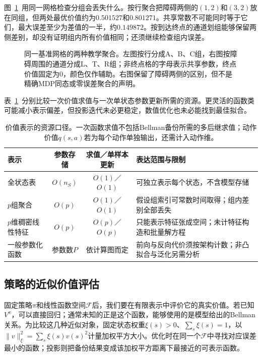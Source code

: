 图~\ref{fig:rl-planning-aggregation}~用同一网格检查分组会丢失什么。按行聚合把障碍两侧的$(1,2)$和$(3,2)$放在同组，但两处最优价值约为$0.501527$和$0.801271$。共享常数不可能同时等于它们，最大误差至少为差值的一半，约$0.149872$。按到达终点的通道划组能够保留两侧差别，却没有证明组内所有价值相同；还须继续检查组内误差。

\begin{figure}[htbp]
 \centering
 
 \caption{同一基准网格的两种教学聚合。左图按行分成A、B、C组，右图按障碍周围的通道分成L、T、R组；非终点格的字母表示共享参数，终点价值固定为0，颜色仅作辅助。右图保留了障碍两侧的区别，但不是精确MDP同态或零误差聚合的声明。}
 \label{fig:rl-planning-aggregation}
\end{figure}

表~\ref{tab:rl-planning-representations}~分别比较一次价值求值与一次单状态参数更新所需的资源。更灵活的函数类可能减小表示偏差，但投影迭代未必更稳定，数值优化也未必能找到最佳拟合。

\begin{table}[htbp]
 \centering
 \small
 \begin{tabularx}{\linewidth}{@{}lcc>{\raggedright\arraybackslash}X@{}}
  \toprule
  表示 & 参数存储 & 求值／单样本更新 & 表达范围与限制\\
  \midrule
  全状态表 & $O(n_S)$ & $O(1)$／$O(1)$ & 可独立表示每个状态，不含模型存储\\
  $p$组聚合 & $O(p)$ & $O(1)$／$O(1)$ & 假设组索引可常数时间取得；组内差别全部丢失\\
  $p$维稠密线性特征 & $O(p)$ & $O(p)$／$O(p)$ & 只能表示特征张成空间；未计特征构造和批量解方程\\
  一般参数化函数 & 参数数$P$ & 依计算图而定 & 前向与反向代价须按架构计数；非凸拟合与泛化另需分析\\
  \bottomrule
 \end{tabularx}
 \caption{价值表示的资源口径。一次函数求值不包括Bellman备份所需的多后继求值；动作价值$q(s,a)$若为每个动作单独输出，还需计入动作维。}
 \label{tab:rl-planning-representations}
\end{table}

\subsection{策略的近似价值评估}
\label{sec:rl-planning-approximate-evaluation}

固定策略$\pi$和线性函数空间$\mathcal F$后，我们要在有限表示中评价它的真实价值。若已知$V^\pi$，可以直接回归；通常未知的正是这个函数，能够使用的是模型给出的Bellman关系。为比较这几种近似对象，固定状态权重$\xi(s)>0$、$\sum_s\xi(s)=1$，以
$\lVert v\rVert_\xi^2=\sum_s\xi(s)v(s)^2$计量加权平方大小。优化时在同一个$\mathcal F$中寻找对应误差最小的函数；投影则把备份结果变成该加权平方距离下最接近的可表示函数。

